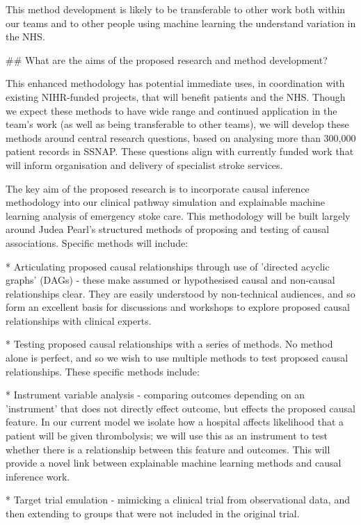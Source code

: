 \begin{markdown}
This method development is likely to be transferable to other work both within our teams and to other people using machine learning the understand variation in the NHS.

## What are the aims of the proposed research and method development?

This enhanced methodology has potential immediate uses, in coordination with existing NIHR-funded projects, that will benefit patients and the NHS. Though we expect these methods to have wide range and continued application in the team's work (as well as being transferable to other teams), we will develop these methods around central research questions, based on analysing more than 300,000 patient records in SSNAP. These questions align with currently funded work that will inform organisation and delivery of specialist stroke services.

The key aim of the proposed research is to incorporate causal inference methodology into our clinical pathway simulation and explainable machine learning analysis of emergency stoke care. This methodology will be built largely around Judea Pearl's structured methods of proposing and testing of causal associations. Specific methods will include:

* Articulating proposed causal relationships through use of 'directed acyclic graphs' (DAGs) - these make assumed or hypothesised causal and non-causal relationships clear. They are easily understood by non-technical audiences, and so form an excellent basis for discussions and workshops to explore proposed causal relationships with clinical experts.

* Testing proposed causal relationships with a series of methods. No method alone is perfect, and so we wish to use multiple methods to test proposed causal relationships. These specific methods include:

    * Instrument variable analysis - comparing outcomes depending on an 'instrument' that does not directly effect outcome, but effects the proposed causal feature. In our current model we isolate how a hospital affects likelihood that a patient will be given thrombolysis; we will use this as an instrument to test whether there is a relationship between this feature and outcomes. This will provide a novel link between explainable machine learning methods and causal inference work.
    
    * Target trial emulation - mimicking a clinical trial from observational data, and then extending to groups that were not included in the original trial.
    

\end{markdown}
